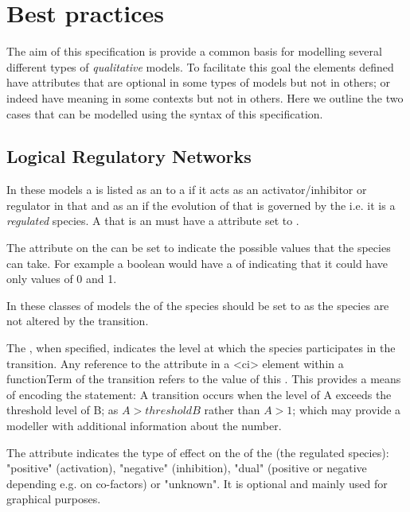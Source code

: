 
\section{Best practices}
\label{best-practices}

The aim of this specification is provide a common basis for modelling several different types of \textit{qualitative} models. To facilitate this goal the elements defined have attributes that are optional in some types of models but not in others; or indeed have meaning in some contexts but not in others.  Here we outline the two cases that can be modelled using the syntax of this specification.

\subsection{Logical Regulatory Networks}

In these models a \QualitativeSpecies is listed as an \Input to a \Transition if it acts as an activator/inhibitor or regulator in that \Transition and as an \Output if the evolution of that \QualitativeSpecies is governed by the \Transition i.e. it is a \textit{regulated} species. A \QualitativeSpecies that is an \Output must have a  attribute set to .

The  attribute on the \QualitativeSpecies can be set to indicate the possible values that the species can take. For example a boolean would have a  of  indicating that it could have only values of 0 and 1. 


In these classes of models the  of the \Input species should be set to  as the \Input species are not altered by the transition.




The , when specified, indicates the level at which the species participates in the transition. Any reference to the \Input {} attribute in a <ci> element within a functionTerm of the transition refers to the value of this . This provides a means of encoding the statement: A transition occurs when the level of A exceeds the threshold level of B; as $A > thresholdB$ rather than $A > 1$; which may provide a modeller with additional information about the number.


The  attribute indicates the type of effect on the \Output of the \Transition (the regulated species): "positive" (activation), "negative" (inhibition), "dual" (positive or negative depending e.g. on co-factors) or "unknown". It is optional and mainly used for graphical purposes.

